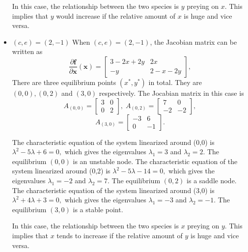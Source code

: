 \documentclass[a4paper,twocolumn]{article} %
\begin{document}
\begin{itemize}
In this case, the relationship between the two species is $y$ preying on $x$. This implies that $y$ would increase if the relative amount of $x$ is huge and vice versa.

\item $(c,e)=(2,-1)$
When $(c,e)=(2,-1)$, the Jacobian matrix can be written as
\begin{equation*}
    \frac{\partial\textbf{f}}{\partial \textbf{x}}(\textbf{x}) =
    \left[\begin{array}{cc}
    3-2x+2y & 2x \\
    -y & 2-x-2y
    \end{array}\right],
\end{equation*}
There are three equilibrium points $(x^*,y^*)$ in total. They are $(0,0),(0,2)$ and $(3,0)$ respectively. The Jocabian matrix in this case is
\begin{equation*}
    A_{(0,0)} =
    \left[\begin{array}{cc}
    3 & 0 \\
    0 & 2
    \end{array}\right], \; A_{(0,2)} =
    \left[\begin{array}{cc}
    7 & 0 \\
    -2 & -2
    \end{array}\right],   
    \end{equation*}
    \begin{equation*}
    A_{(3,0)} =
    \left[\begin{array}{cc}
    -3 & 6 \\
    0 & -1
    \end{array}\right].
\end{equation*}

The characteristic equation of the system linearized around \mbox{(0,0)} is
$\lambda^2 -5 \lambda + 6 = 0,$ which gives the eigenvalues $\lambda_{1} = 3$ and $\lambda_{2} = 2$. The equilibrium $(0,0)$ is an unstable node. 
The characteristic equation of the system linearized around \mbox{(0,2)} is
$\lambda^2 -5 \lambda - 14 = 0,$ which gives the eigenvalues $\lambda_1 = -2$ and $\lambda_2 = 7$. The equilibrium $(0,2)$ is a saddle node. 
The characteristic equation of the system linearized around \mbox{(3,0)} is
$\lambda^2 +4 \lambda + 3 = 0,$ which gives the eigenvalues $\lambda_1 = -3$ and $\lambda_2 = -1$. The equilibrium $(3,0)$ is a stable point.

In this case, the relationship between the two species is $x$ preying on $y$. This implies that $x$ tends to increase if the relative amount of $y$ is huge and vice versa.   


\end{itemize}
\end{document}
